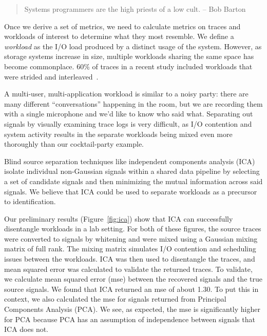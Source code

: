 \begin{quote}
Systems programmers are the high priests of a low cult.
-- Bob Barton
\end{quote}



Once we derive a set of metrics, we need to calculate metrics on traces and
workloads of interest to determine what \mw they most resemble.  We define 
a \textit{workload} as the I/O load produced by a distinct usage of the system.  
However, as storage systems increase in size, multiple workloads sharing the
same space has become commonplace.  
60\% of traces in a recent study included workloads that were strided and
interleaved~\cite{seo_char}.  

 A multi-user, multi-application workload is similar to a
noisy party: there are many different ``conversations'' happening in the room,
but we are recording them with a single microphone and we'd like to know who
said what.  Separating out signals by visually examining trace logs is very
difficult, as I/O contention and system activity results in the separate
workloads being mixed even more thoroughly than our cocktail-party example.

Blind source separation techniques like independent components
analysis (ICA) isolate individual non-Gaussian
signals within a shared data pipeline by selecting a set of candidate signals
and then minimizing the mutual information across said signals.     
We believe that ICA could be used to separate workloads as a precursor to
identification.

Our preliminary results (Figure~\ref{fig:ica}) show that ICA
can successfully disentangle workloads in a lab setting.  For both of these
figures, the source traces were converted to signals by whitening and were mixed using
a Gaussian mixing matrix of full rank.  The mixing matrix simulates I/O
contention and scheduling issues between the workloads.  
ICA was then used to disentangle the
traces, and mean squared error was calculated to validate the returned traces.  
To validate, we calculate mean squared error (mse) between the recovered signals and
the true source signals.  We found that ICA returned an mse of about 1.30.  To
put this in context, we also calculated the mse for signals returned from
Principal Components Analysis (PCA).  We see, as expected, the mse is
significantly higher for PCA because PCA has an assumption of independence
between signals that ICA does not. 

